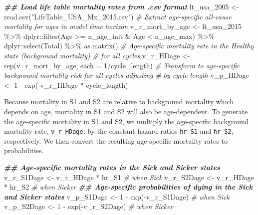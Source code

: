 \documentclass[
]{article}
\newenvironment{Shaded}{\begin{snugshade}}{\end{snugshade}}
\newcommand{\AttributeTok}[1]{\textcolor[rgb]{0.77,0.63,0.00}{#1}}
\newcommand{\CommentTok}[1]{\textcolor[rgb]{0.56,0.35,0.01}{\textit{#1}}}
\newcommand{\DecValTok}[1]{\textcolor[rgb]{0.00,0.00,0.81}{#1}}
\newcommand{\DocumentationTok}[1]{\textcolor[rgb]{0.56,0.35,0.01}{\textbf{\textit{#1}}}}
\newcommand{\FunctionTok}[1]{\textcolor[rgb]{0.00,0.00,0.00}{#1}}
\newcommand{\NormalTok}[1]{#1}
\newcommand{\OtherTok}[1]{\textcolor[rgb]{0.56,0.35,0.01}{#1}}
\newcommand{\SpecialCharTok}[1]{\textcolor[rgb]{0.00,0.00,0.00}{#1}}
\newcommand{\StringTok}[1]{\textcolor[rgb]{0.31,0.60,0.02}{#1}}
\begin{document}
\begin{Shaded}
\begin{Highlighting}[]
\DocumentationTok{\#\# Load life table mortality rates from \textasciigrave{}.csv\textasciigrave{} format}
\NormalTok{lt\_usa\_2005 }\OtherTok{\textless{}{-}} \FunctionTok{read.csv}\NormalTok{(}\StringTok{"LifeTable\_USA\_Mx\_2015.csv"}\NormalTok{)}
\CommentTok{\# Extract age{-}specific all{-}cause mortality for ages in model time horizon}
\NormalTok{v\_r\_mort\_by\_age }\OtherTok{\textless{}{-}}\NormalTok{ lt\_usa\_2015 }\SpecialCharTok{\%\textgreater{}\%} 
\NormalTok{  dplyr}\SpecialCharTok{::}\FunctionTok{filter}\NormalTok{(Age }\SpecialCharTok{\textgreater{}=}\NormalTok{ n\_age\_init }\SpecialCharTok{\&}\NormalTok{ Age }\SpecialCharTok{\textless{}}\NormalTok{ n\_age\_max) }\SpecialCharTok{\%\textgreater{}\%}
\NormalTok{  dplyr}\SpecialCharTok{::}\FunctionTok{select}\NormalTok{(Total) }\SpecialCharTok{\%\textgreater{}\%}
  \FunctionTok{as.matrix}\NormalTok{()}
\CommentTok{\# Age{-}specific mortality rate in the Healthy state (background mortality) }
\CommentTok{\# for all cycles}
\NormalTok{v\_r\_HDage  }\OtherTok{\textless{}{-}} \FunctionTok{rep}\NormalTok{(v\_r\_mort\_by\_age, }\AttributeTok{each =} \DecValTok{1}\SpecialCharTok{/}\NormalTok{cycle\_length)}
\CommentTok{\# Transform to age{-}specific background mortality risk for all cycles adjusting }
\CommentTok{\# by cycle length}
\NormalTok{v\_p\_HDage  }\OtherTok{\textless{}{-}} \DecValTok{1} \SpecialCharTok{{-}} \FunctionTok{exp}\NormalTok{(}\SpecialCharTok{{-}}\NormalTok{v\_r\_HDage }\SpecialCharTok{*}\NormalTok{ cycle\_length) }
\end{Highlighting}
\end{Shaded}

Because mortality in S1 and S2 are relative to background mortality which depends on age, mortality in S1 and S2 will also be age-dependent. To generate the age-specific mortality in S1 and S2, we multiply the age-specific background mortality rate, \texttt{v\_r\_HDage}, by the constant hazard ratios \texttt{hr\_S1} and \texttt{hr\_S2}, respectively. We then convert the resulting age-specific mortality rates to probabilities.

\begin{Shaded}
\begin{Highlighting}[]
\DocumentationTok{\#\# Age{-}specific mortality rates in the Sick and Sicker states}
\NormalTok{v\_r\_S1Dage }\OtherTok{\textless{}{-}}\NormalTok{ v\_r\_HDage }\SpecialCharTok{*}\NormalTok{ hr\_S1 }\CommentTok{\# when Sick}
\NormalTok{v\_r\_S2Dage }\OtherTok{\textless{}{-}}\NormalTok{ v\_r\_HDage }\SpecialCharTok{*}\NormalTok{ hr\_S2 }\CommentTok{\# when Sicker}
\DocumentationTok{\#\# Age{-}specific probabilities of dying in the Sick and Sicker states}
\NormalTok{v\_p\_S1Dage }\OtherTok{\textless{}{-}} \DecValTok{1} \SpecialCharTok{{-}} \FunctionTok{exp}\NormalTok{(}\SpecialCharTok{{-}}\NormalTok{v\_r\_S1Dage) }\CommentTok{\# when Sick}
\NormalTok{v\_p\_S2Dage }\OtherTok{\textless{}{-}} \DecValTok{1} \SpecialCharTok{{-}} \FunctionTok{exp}\NormalTok{(}\SpecialCharTok{{-}}\NormalTok{v\_r\_S2Dage) }\CommentTok{\# when Sicker}
\end{Highlighting}
\end{Shaded}
\end{document}
